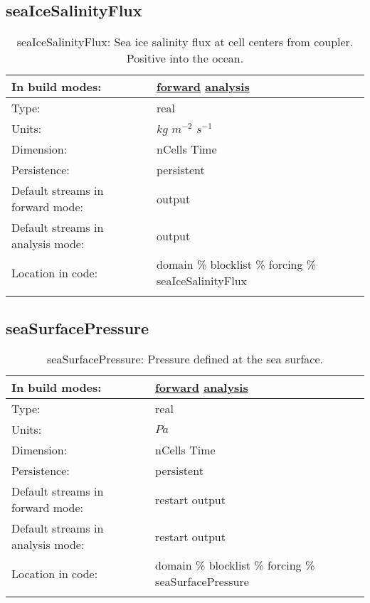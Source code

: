 \subsection[seaIceSalinityFlux]{seaIceSalinityFlux}
\label{subsec:var_sec_forcing_seaIceSalinityFlux}
\begin{center}
\begin{longtable}{| p{2.0in} | p{4.0in} |}
        \hline 
        In build modes: & \hyperref[subsec:forward_var_tab_forcing]{forward} \hyperref[subsec:analysis_var_tab_forcing]{analysis} \\
        \hline 
        Type: & real \\
        \hline 
        Units: & $kg$ $m^{-2}$ $s^{-1}$ \\
        \hline 
        Dimension: & nCells Time \\
        \hline 
        Persistence: & persistent \\
        \hline 
		 Default streams in forward mode: &  output \\
        \hline 
		 Default streams in analysis mode: &  output \\
        \hline 
		 Location in code: & domain \% blocklist \% forcing \% seaIceSalinityFlux \\
		 \hline 
    \caption{seaIceSalinityFlux: Sea ice salinity flux at cell centers from coupler. Positive into the ocean.}
\end{longtable}
\end{center}
\subsection[seaSurfacePressure]{seaSurfacePressure}
\label{subsec:var_sec_forcing_seaSurfacePressure}
\begin{center}
\begin{longtable}{| p{2.0in} | p{4.0in} |}
        \hline 
        In build modes: & \hyperref[subsec:forward_var_tab_forcing]{forward} \hyperref[subsec:analysis_var_tab_forcing]{analysis} \\
        \hline 
        Type: & real \\
        \hline 
        Units: & $Pa$ \\
        \hline 
        Dimension: & nCells Time \\
        \hline 
        Persistence: & persistent \\
        \hline 
		 Default streams in forward mode: &  restart output \\
        \hline 
		 Default streams in analysis mode: &  restart output \\
        \hline 
		 Location in code: & domain \% blocklist \% forcing \% seaSurfacePressure \\
		 \hline 
    \caption{seaSurfacePressure: Pressure defined at the sea surface.}
\end{longtable}
\end{center}
